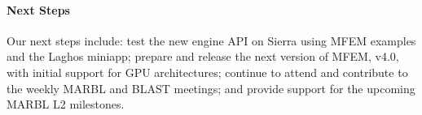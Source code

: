 \paragraph{Next Steps}

Our next steps include:
test the new engine API on Sierra using MFEM examples and the Laghos miniapp;
prepare and release the next version of MFEM, v4.0, with initial support for
GPU architectures;
continue to attend and contribute to the weekly MARBL and BLAST meetings;
and provide support for the upcoming MARBL L2 milestones.

